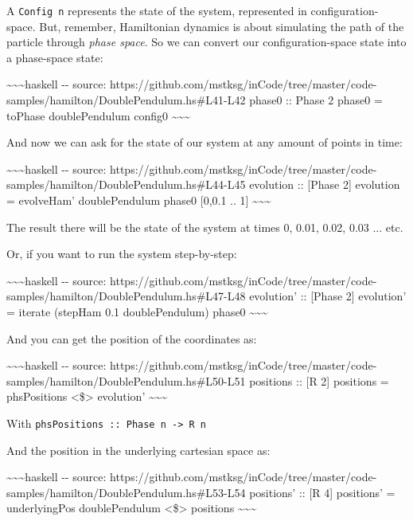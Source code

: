 \documentclass[]{article}
\begin{document}
A \texttt{Config\ n} represents the state of the system, represented in
configuration-space. But, remember, Hamiltonian dynamics is about simulating the
path of the particle through \emph{phase space}. So we can convert our
configuration-space state into a phase-space state:

\textasciitilde{}\textasciitilde{}\textasciitilde{}haskell -\/- source:
https://github.com/mstksg/inCode/tree/master/code-samples/hamilton/DoublePendulum.hs\#L41-L42
phase0 :: Phase 2 phase0 = toPhase doublePendulum config0
\textasciitilde{}\textasciitilde{}\textasciitilde{}

And now we can ask for the state of our system at any amount of points in time:

\textasciitilde{}\textasciitilde{}\textasciitilde{}haskell -\/- source:
https://github.com/mstksg/inCode/tree/master/code-samples/hamilton/DoublePendulum.hs\#L44-L45
evolution :: {[}Phase 2{]} evolution = evolveHam' doublePendulum phase0 {[}0,0.1
.. 1{]} \textasciitilde{}\textasciitilde{}\textasciitilde{}

The result there will be the state of the system at times 0, 0.01, 0.02, 0.03
... etc.

Or, if you want to run the system step-by-step:

\textasciitilde{}\textasciitilde{}\textasciitilde{}haskell -\/- source:
https://github.com/mstksg/inCode/tree/master/code-samples/hamilton/DoublePendulum.hs\#L47-L48
evolution' :: {[}Phase 2{]} evolution' = iterate (stepHam 0.1 doublePendulum)
phase0 \textasciitilde{}\textasciitilde{}\textasciitilde{}

And you can get the position of the coordinates as:

\textasciitilde{}\textasciitilde{}\textasciitilde{}haskell -\/- source:
https://github.com/mstksg/inCode/tree/master/code-samples/hamilton/DoublePendulum.hs\#L50-L51
positions :: {[}R 2{]} positions = phsPositions \textless{}\$\textgreater{}
evolution' \textasciitilde{}\textasciitilde{}\textasciitilde{}

With \texttt{phsPositions\ ::\ Phase\ n\ -\textgreater{}\ R\ n}

And the position in the underlying cartesian space as:

\textasciitilde{}\textasciitilde{}\textasciitilde{}haskell -\/- source:
https://github.com/mstksg/inCode/tree/master/code-samples/hamilton/DoublePendulum.hs\#L53-L54
positions' :: {[}R 4{]} positions' = underlyingPos doublePendulum
\textless{}\$\textgreater{} positions
\textasciitilde{}\textasciitilde{}\textasciitilde{}
\end{document}
